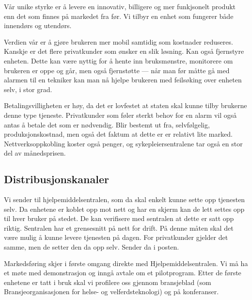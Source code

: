 Vår unike styrke er å levere en innovativ, billigere og mer funkjsonelt produkt
enn det som finnes på markedet fra før. Vi tilbyr en enhet som fungerer både
innendørs og utendørs.

Verdien vår er å gjøre brukeren mer mobil samtidig som kostnader reduseres.
Kanskje er det flere privatkunder som ønsker en slik løsning. Kan også
fjernstyre enheten. Dette kan være nyttig for å hente inn bruksmønstre,
monitorere om brukeren er oppe og går, men også fjernstøtte --- når man før
måtte gå med alarmen til en tekniker kan man nå hjelpe brukeren med feilsøking
over enheten selv, i stor grad.

Betalingsvilligheten er høy, da det er lovfestet at staten skal kunne tilby
brukerne denne type tjeneste. Privatkunder som føler sterkt behov for en alarm
vil også antas å betale det som er nødvendig. Blir bestemt ut fra,
selvfølgelig, produksjonskostnad, men også det faktum at dette er er relativt
lite marked. Nettverksoppkobling koster også penger, og sykepleiersentralene
tar også en stor del av månedsprisen.

\subsection{Distribusjonskanaler}



Vi sender til hjelpemiddelsentralen, som da skal enkelt kunne sette opp
tjenesten selv. Da enhetene er koblet opp mot nett og har en skjerm kan de lett
settes opp til hver bruker på stedet. De kan verifisere med sentralen at dette
er satt opp riktig. Sentralen har et grensesnitt på nett for drift. På denne
måten skal det være mulig å kunne levere tjenesten på dagen. For privatkunder
gjelder det samme, men de setter den da opp selv. Sender da i posten.

Markedsføring skjer i første omgang direkte med Hjelpemiddelsentralen. Vi må ha
et møte med demonstrasjon og inngå avtale om et pilotprogram. Etter de første
enhetene er tatt i bruk skal vi profilere oss gjennom bransjeblad (som
Bransjeorganisasjonen for helse- og velferdsteknologi) og på konferanser.

